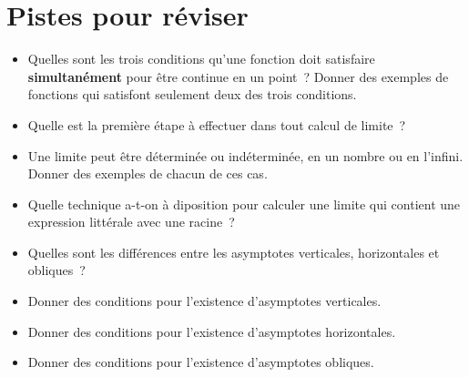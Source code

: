 \documentclass[a4paper,12pt]{article}
\begin{document}
\section{Pistes pour réviser}
\begin{itemize}
	\item Quelles sont les trois conditions qu'une fonction doit satisfaire {\bfseries simultanément} pour être continue en un point~? Donner des exemples de fonctions qui satisfont seulement deux des trois conditions.
	\item Quelle est la première étape à effectuer dans tout calcul de limite~?
	\item Une limite peut être déterminée ou indéterminée, en un nombre ou en l'infini. Donner des exemples de chacun de ces cas. 
	\item Quelle technique a-t-on à diposition pour calculer une limite qui contient une expression littérale avec une racine~?
	\item Quelles sont les différences entre les asymptotes verticales, horizontales et obliques~?
	\item Donner des conditions pour l'existence d'asymptotes verticales. 
	\item Donner des conditions pour l'existence d'asymptotes horizontales. 
	\item Donner des conditions pour l'existence d'asymptotes obliques. 
\end{itemize}
 \nocite{*}
 \vspace{-10pt}
 \printbibliography[prenote=myprenote,title={Sources du cours}] 
\end{document}
